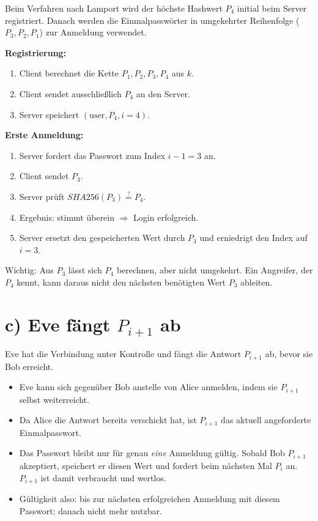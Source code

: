 \documentclass[
	fontsize=12pt,
	paper=a4,
	numbers=noenddot,
	listof=totoc,
	listof=entryprefix,
	listof=nochaptergap,
	bibliography=totoc,
	parskip=half,
	openany
]{scrbook}
\begin{document}
Beim Verfahren nach Lamport wird der höchste Hashwert $P_4$ initial beim Server registriert.
Danach werden die Einmalpasswörter in umgekehrter Reihenfolge ($P_3, P_2, P_1$) zur Anmeldung verwendet.

\textbf{Registrierung:}
\begin{enumerate}
	\item Client berechnet die Kette $P_1, P_2, P_3, P_4$ aus $k$.
	\item Client sendet ausschließlich $P_4$ an den Server.
	\item Server speichert $(\text{user}, P_4, i=4)$.
\end{enumerate}

\textbf{Erste Anmeldung:}
\begin{enumerate}
	\item Server fordert das Passwort zum Index $i-1 = 3$ an.
	\item Client sendet $P_3$.
	\item Server prüft $SHA256(P_3) \stackrel{?}{=} P_4$.
	\item Ergebnis: stimmt überein $\Rightarrow$ Login erfolgreich.
	\item Server ersetzt den gespeicherten Wert durch $P_3$ und erniedrigt den Index auf $i=3$.
\end{enumerate}

Wichtig: Aus $P_3$ lässt sich $P_4$ berechnen, aber nicht umgekehrt.
Ein Angreifer, der $P_4$ kennt, kann daraus nicht den nächsten benötigten Wert $P_3$ ableiten.

\section*{c) Eve fängt $P_{i+1}$ ab}

Eve hat die Verbindung unter Kontrolle und fängt die Antwort $P_{i+1}$ ab, bevor sie Bob erreicht.

\begin{itemize}
	\item Eve kann sich gegenüber Bob anstelle von Alice anmelden, indem sie $P_{i+1}$ selbst weiterreicht.
	\item Da Alice die Antwort bereits verschickt hat, ist $P_{i+1}$ das aktuell angeforderte Einmalpasswort.
	\item Das Passwort bleibt nur für genau \emph{eine} Anmeldung gültig.
	Sobald Bob $P_{i+1}$ akzeptiert, speichert er diesen Wert und fordert beim nächsten Mal $P_i$ an.
	$P_{i+1}$ ist damit verbraucht und wertlos.
	\item Gültigkeit also: bis zur nächsten erfolgreichen Anmeldung mit diesem Passwort; danach nicht mehr nutzbar.
\end{itemize}
\end{document}
